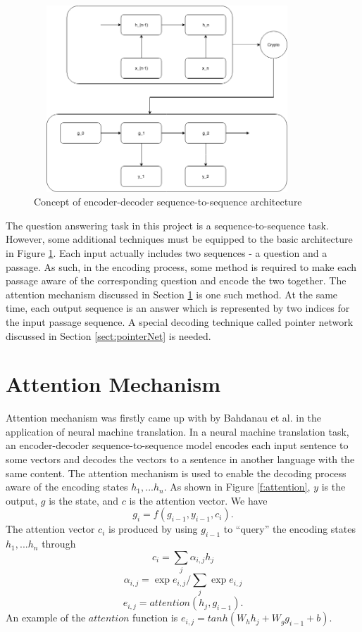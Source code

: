 \documentclass[modernstyle,12pt]{sjsuthesis}
\theoremstyle{definition}
\begin{document}
\begin{figure}[htbp]\centering
  \includegraphics[width=10cm, height=7cm]{figures/encoderDecoder.png}
  \caption{Concept of encoder-decoder sequence-to-sequence architecture}
  \label{f:encoderDecoder}
\end{figure}

The question answering task in this project is a sequence-to-sequence task. However, some additional techniques must be equipped to the basic architecture in Figure \ref{f:encoderDecoder}. Each input actually includes two sequences - a question and a passage. As such, in the encoding process, some method is required to make each passage aware of the corresponding question and encode the two together. The attention mechanism discussed in Section \ref{sect:attention} is one such method. At the same time, each output sequence is an answer which is represented by two indices for the input passage sequence. A special decoding technique called pointer network discussed in Section \ref{sect:pointerNet} is needed.

\section{Attention Mechanism}\label{sect:attention}

Attention mechanism was firstly came up with by Bahdanau et al. in the application of neural machine translation\cite{bahdanau2014neural}. In a neural machine translation task, an encoder-decoder sequence-to-sequence model encodes each input sentence to some vectors and decodes the vectors to a sentence in another language with the same content. The attention mechanism is used to enable the decoding process aware of the encoding states $h_1, ... h_n$. As shown in Figure \ref{f:attention}, $y$ is the output, $g$ is the state, and $c$ is the attention vector. We have
$$g_i =f(g_{i-1},y_{i-1},c_i).$$
The attention vector $c_i$ is produced by using $g_{i-1}$ to ``query'' the encoding states $h_1, ... h_n$ through
$$c_i = \sum _j {\alpha _{i,j} h_j}$$
$$\alpha _{i,j} = \exp{e_{i,j}} / \sum _j {\exp{e_{i,j}}}$$
$$e_{i,j} = attention(h_j, g_{i-1}).$$
An example of the $attention$ function is $e_{i,j} = tanh(W_h h_j + W_g g_{i-1} + b)$.
\end{document}
